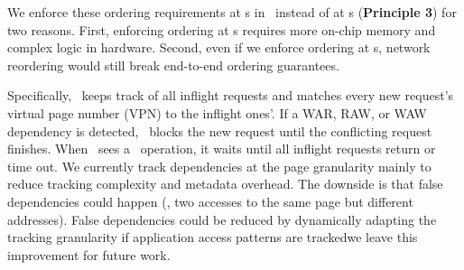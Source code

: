 

We enforce these ordering requirements at \CN{}s in \syslib\ instead of at \MN{}s (\textbf{Principle 3}) for two reasons.
First, enforcing ordering at \MN{}s requires more on-chip memory and complex logic in hardware.
Second, even if we enforce ordering at \MN{}s, network reordering would still break end-to-end ordering guarantees.

Specifically, \syslib\ keeps track of all inflight requests and matches every new request's virtual page number (VPN) to the inflight ones'. 
If a WAR, RAW, or WAW dependency is detected, \syslib\ blocks the new request until the conflicting request finishes.
When \syslib\ sees a \release\ operation, it waits until all inflight requests return or time out.
We currently track dependencies at the page granularity mainly to reduce tracking complexity and metadata overhead. The downside is that false dependencies could happen (\eg, two accesses to the same page but different addresses).
False dependencies could be reduced by dynamically adapting the tracking granularity if application access patterns are tracked\textemdash we leave this improvement for future work.

